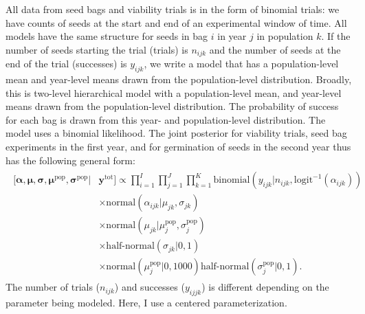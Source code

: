 \documentclass[12pt, oneside, titlepage]{article}   	%
\begin{document}
All data from seed bags and viability trials is in the form of binomial trials: we have counts of seeds at the start and end of an experimental window of time. All models have the same structure for seeds in bag $i$ in year $j$ in population $k$. If the number of seeds starting the trial (trials) is $n_{ijk}$ and the number of seeds at the end of the trial (successes) is $y_{ijk}$, we write a model that has a population-level mean and year-level means drawn from the population-level distribution. Broadly, this is two-level hierarchical model with a population-level mean, and year-level means drawn from the population-level distribution. The probability of success for each bag is drawn from this year- and population-level distribution. The model uses a binomial likelihood. The joint posterior for viability trials, seed bag experiments in the first year, and for germination of seeds in the second year thus has the following general form:
%
\begin{align}
  \begin{split}
 [  \bm{\alpha} , \bm{\mu} , \bm{\sigma} , \bm{\mu^\mathrm{pop}}, \bm{\sigma^\mathrm{pop}} | & \bm{y^{\mathrm{tot}}}  ] \propto \prod_{i=1}^{I}   \prod_{j=1}^{J}  \prod_{k=1}^{K} 
   \mathrm{binomial} ( y_{ijk} | n_{ijk}, \mathrm{logit}^{-1}( \alpha_{ijk} ) ) 
   \\ & \times \mathrm{normal} ( \alpha_{ijk}  | \mu_{jk}, \sigma{_{jk} })
  \\ & \times \mathrm{normal} ( \mu_{jk}  | \mu^\mathrm{pop}_{j}, \sigma^\mathrm{pop}_{j} )
  \\ & \times \textrm{half-normal} ( \sigma_{jk} | 0,1)
  \\ & \times \mathrm{normal} ( \mu^\mathrm{pop}_{j} | 0 , 1000 ) \textrm{half-normal} ( \sigma^\mathrm{pop}_{j} | 0,1).
  \end{split}
\end{align}
%
 The number of trials ($n_{ijk}$) and successes ($y_{ijjk}$) is different depending on the parameter being modeled. Here, I use a centered parameterization.
 
\end{document}
